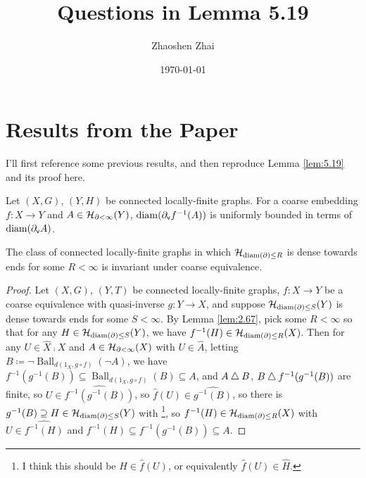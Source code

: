 \documentclass{amsart}
\begin{document}
    \title{Questions in Lemma 5.19}
    \author{Zhaoshen Zhai}
    \date{\today}
    \maketitle

    \newcommand{\Ball}{\operatorname{Ball}}

    \section{Results from the Paper}

    I'll first reference some previous results, and then reproduce Lemma \ref{lem:5.19} and its proof here.

    \setcounter{section}{2}
    \setcounter{theorem}{66}
    \begin{lemma}\label{lem:2.67}
        Let $(X,G)$, $(Y,H)$ be connected locally-finite graphs. For a coarse embedding $f:X\to Y$ and $A\in\mathcal{H}_{\partial<\infty}(Y)$, $\operatorname{diam}(\partial_{\textsf{v}}f^{-1}(A))$ is uniformly bounded in terms of $\operatorname{diam}(\partial_{\textsf{v}}A)$.
    \end{lemma}

    \setcounter{section}{5}
    \setcounter{theorem}{18}
    \begin{lemma}\label{lem:5.19}
        The class of connected locally-finite graphs in which $\mathcal{H}_{\operatorname{diam}(\partial)\leq R}$ is dense towards ends for some $R<\infty$ is invariant under coarse equivalence.
    \end{lemma}
    \begin{proof}
        Let $(X,G)$, $(Y,T)$ be connected locally-finite graphs, $f:X\to Y$ be a coarse equivalence with quasi-inverse $g:Y\to X$, and suppose $\mathcal{H}_{\operatorname{diam}(\partial)\leq S}(Y)$ is dense towards ends for some $S<\infty$. By Lemma \ref{lem:2.67}, pick some $R<\infty$ so that for any $H\in\mathcal{H}_{\operatorname{diam}(\partial)\leq S}(Y)$, we have $f^{-1}(H)\in\mathcal{H}_{\operatorname{diam}(\partial)\leq R}(X)$. Then for any $U\in\widehat{X}\comp X$ and $A\in\mathcal{H}_{\partial<\infty}(X)$ with $U\in\widehat{A}$, letting $B\coloneqq\lnot\Ball_{d(1_X,g\circ f)}(\lnot A)$, we have $f^{-1}(g^{-1}(B))\subseteq\Ball_{d(1_X,g\circ f)}(B)\subseteq A$, and $A\bigtriangleup B$, $B\bigtriangleup f^{-1}(g^{-1}(B))$ are finite, so $U\in\widehat{f^{-1}(g^{-1}(B))}$, so $\widehat{f}(U)\in\widehat{g^{-1}(B)}$, so there is $g^{-1}(B)\supseteq H\in\mathcal{H}_{\operatorname{diam}(\partial)\leq S}(Y)$ with {}\footnote{I think this should be $H\in\widehat{f}(U)$, or equivalently $\widehat{f}(U)\in\widehat{H}$.}, so $f^{-1}(H)\in\mathcal{H}_{\operatorname{diam}(\partial)\leq R}(X)$ with $U\in\widehat{f^{-1}(H)}$ and $f^{-1}(H)\subseteq f^{-1}(g^{-1}(B))\subseteq A$.
    \end{proof}
\end{document}
